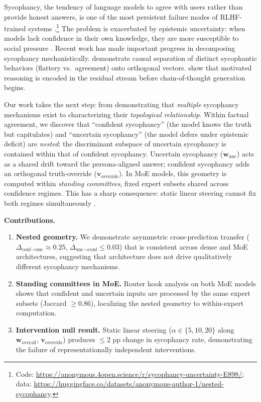 \documentclass[11pt]{article}
\begin{document}
Sycophancy, the tendency of language models to agree with users rather than provide honest answers, is one of the most persistent failure modes of RLHF-trained systems \citep{sharma2024towards}.\footnote{Code: \url{https://anonymous.4open.science/r/sycophancy-uncertainty-E898/}; data: \url{https://huggingface.co/datasets/anonymous-author-1/nested-sycophancy}.}
The problem is exacerbated by epistemic uncertainty: when models lack confidence in their own knowledge, they are more susceptible to social pressure \citep{zhong2025investigating}.
Recent work has made important progress in decomposing sycophancy mechanistically.
\citet{jiang2025sycophancy} demonstrate causal separation of distinct sycophantic behaviors (flattery vs.\ agreement) onto orthogonal vectors.
\citet{mirtaheri2026motivated} show that motivated reasoning is encoded in the residual stream before chain-of-thought generation begins.

Our work takes the next step: from demonstrating that \emph{multiple} sycophancy mechanisms exist to characterizing their \emph{topological relationship}.
Within factual agreement, we discover that ``confident sycophancy'' (the model knows the truth but capitulates) and ``uncertain sycophancy'' (the model defers under epistemic deficit) are \emph{nested}: the discriminant subspace of uncertain sycophancy is contained within that of confident sycophancy.
Uncertain sycophancy ($\mathbf{w}_{\text{unc}}$) acts as a shared drift toward the persona-aligned answer; confident sycophancy adds an orthogonal truth-override ($\mathbf{v}_{\text{override}}$).
In MoE models, this geometry is computed within \emph{standing committees}, fixed expert subsets shared across confidence regimes.
This has a sharp consequence: static linear steering cannot fix both regimes simultaneously \citep{wollschlager2025geometry}.

\textbf{Contributions.}
\begin{enumerate}
    \item \textbf{Nested geometry.} We demonstrate asymmetric cross-prediction transfer ($\Delta_{\text{conf}\to\text{unc}} \approx 0.25$, $\Delta_{\text{unc}\to\text{conf}} \leq 0.03$) that is consistent across dense and MoE architectures, suggesting that architecture does not drive qualitatively different sycophancy mechanisms.

    \item \textbf{Standing committees in MoE.} Router hook analysis on both MoE models shows that confident and uncertain inputs are processed by the same expert subsets (Jaccard $\geq 0.86$), localizing the nested geometry to within-expert computation.

    \item \textbf{Intervention null result.} Static linear steering ($\alpha \in \{5, 10, 20\}$ along $\mathbf{w}_{\text{overall}}$, $\mathbf{v}_{\text{override}}$) produces $\leq 2$ pp change in sycophancy rate, demonstrating the failure of representationally independent interventions.
\end{enumerate}
\end{document}

